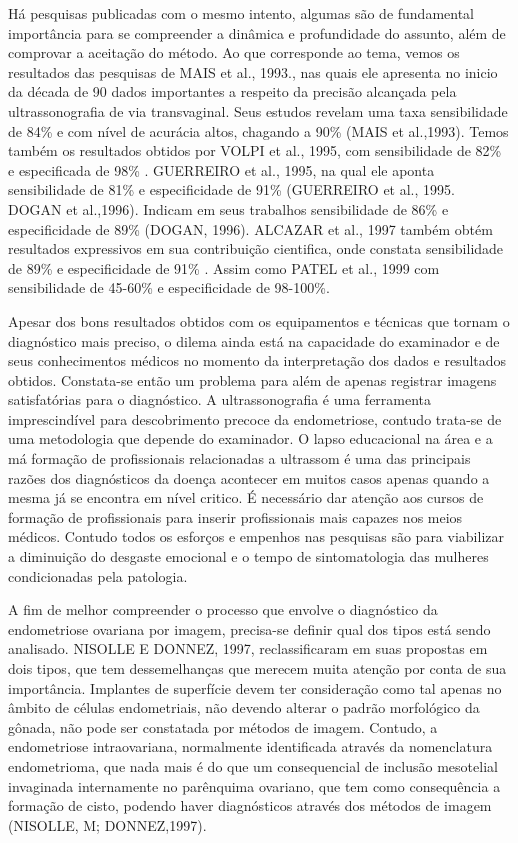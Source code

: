 \documentclass[12pt]{article} %
\begin{document}
Há pesquisas publicadas com o mesmo intento, algumas são de fundamental importância para se compreender a dinâmica e profundidade do assunto, além de comprovar a aceitação do método. Ao que corresponde ao tema, vemos os resultados das pesquisas de MAIS et al., 1993., nas quais ele apresenta no inicio da década de 90 dados importantes a respeito da precisão alcançada pela ultrassonografia de via transvaginal. Seus estudos revelam uma taxa sensibilidade de 84\% e com nível de acurácia altos, chagando a 90\% (MAIS et al.,1993). Temos também os resultados obtidos por VOLPI et al., 1995, com sensibilidade de 82\% e especificada de 98\% .  GUERREIRO et al., 1995,  na qual ele aponta sensibilidade de 81\% e especificidade de 91\% (GUERREIRO et al., 1995. DOGAN et al.,1996). Indicam em seus trabalhos sensibilidade de 86\% e especificidade de 89\% (DOGAN, 1996). ALCAZAR et al., 1997 também obtém resultados expressivos em sua contribuição cientifica, onde constata sensibilidade de 89\% e especificidade de 91\% . Assim como PATEL et al., 1999 com sensibilidade de 45-60\% e especificidade de 98-100\%. 

Apesar dos bons resultados obtidos com os equipamentos e técnicas que tornam o
diagnóstico mais preciso, o dilema ainda está na capacidade do examinador e de seus conhecimentos médicos no momento da interpretação dos dados e resultados obtidos.  Constata-se então um problema para além de apenas registrar imagens satisfatórias para o diagnóstico. A ultrassonografia é uma ferramenta imprescindível para descobrimento precoce da endometriose, contudo trata-se de uma metodologia que depende do examinador. O lapso educacional na área e a má formação de profissionais relacionadas a ultrassom é uma das principais razões dos diagnósticos da doença acontecer em muitos casos apenas quando a mesma já se encontra em nível critico. É necessário dar atenção aos cursos de formação de profissionais para inserir profissionais mais capazes nos meios médicos. Contudo todos os esforços e empenhos nas pesquisas são para viabilizar a diminuição do desgaste emocional e o tempo de sintomatologia das mulheres condicionadas pela patologia. 

A fim de melhor compreender o processo que envolve o diagnóstico da endometriose ovariana por imagem, precisa-se definir qual dos tipos está sendo analisado. NISOLLE E DONNEZ, 1997, reclassificaram em suas propostas em dois tipos, que tem dessemelhanças que merecem muita atenção por conta de sua importância. Implantes de superfície devem ter consideração como tal apenas no âmbito de células endometriais, não devendo alterar o padrão morfológico da gônada, não pode ser constatada por métodos de imagem. Contudo, a endometriose intraovariana, normalmente identificada através da nomenclatura endometrioma, que nada mais é do que um consequencial de inclusão mesotelial invaginada internamente no parênquima ovariano, que tem como consequência a formação de cisto, podendo haver diagnósticos através dos métodos de imagem (NISOLLE, M; DONNEZ,1997). 
\end{document}
